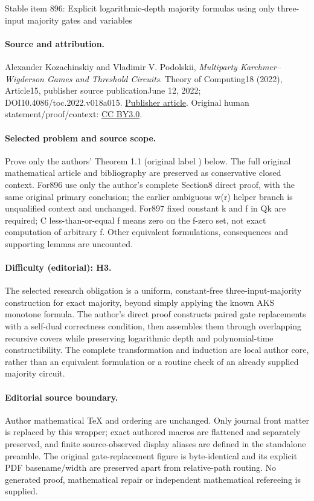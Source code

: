 \documentclass[11pt]{article}
\numberwithin{equation}{section}
\theoremstyle{definition}
\theoremstyle{plain}
\begin{document}
\begin{center}{\Large Stable item 896: Explicit logarithmic-depth majority formulas using only three-input majority gates and variables}\end{center}
\paragraph{Source and attribution.}
Alexander Kozachinskiy and Vladimir V. Podolskii, \emph{Multiparty Karchmer--Wigderson Games and Threshold Circuits}. Theory of Computing18 (2022), Article15, publisher source publicationJune 12, 2022; DOI10.4086/toc.2022.v018a015. \href{https://theoryofcomputing.org/articles/v018a015/}{Publisher article}. Original human statement/proof/context: \href{https://creativecommons.org/licenses/by/3.0/}{CC BY3.0}.
\paragraph{Selected problem and source scope.}
Prove only the authors' Theorem 1.1 (original label ) below. The full original mathematical article and bibliography are preserved as conservative closed context. For896 use only the author's complete Section8 direct proof, with the same original primary conclusion; the earlier ambiguous w(r) helper branch is unqualified context and unchanged. For897 fixed constant k and f in Qk are required; C less-than-or-equal f means zero on the f-zero set, not exact computation of arbitrary f. Other equivalent formulations, consequences and supporting lemmas are uncounted.
\paragraph{Difficulty (editorial): H3.}
The selected research obligation is a uniform, constant-free three-input-majority construction for exact majority, beyond simply applying the known AKS monotone formula. The author's direct proof constructs paired gate replacements with a self-dual correctness condition, then assembles them through overlapping recursive covers while preserving logarithmic depth and polynomial-time constructibility. The complete transformation and induction are local author core, rather than an equivalent formulation or a routine check of an already supplied majority circuit.
\paragraph{Editorial source boundary.}
Author mathematical TeX and ordering are unchanged. Only journal front matter is replaced by this wrapper; exact authored macros are flattened and separately preserved, and finite source-observed display aliases are defined in the standalone preamble. The original gate-replacement figure is byte-identical and its explicit PDF basename/width are preserved apart from relative-path routing. No generated proof, mathematical repair or independent mathematical refereeing is supplied. 
\clearpage
\end{document}
